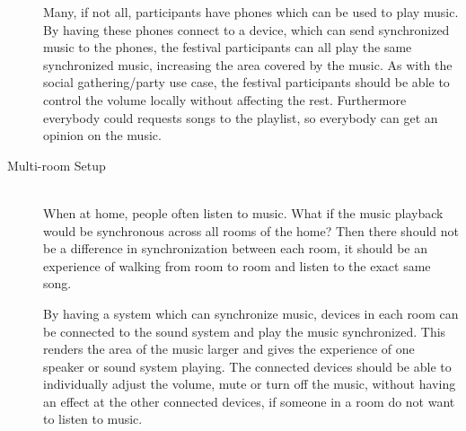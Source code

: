\begin{description}
        Many, if not all, participants have phones which can be used to play music.
        By having these phones connect to a device, which can send synchronized music to the phones,
        the festival participants can all play the same synchronized music,
        increasing the area covered by the music.
        As with the social gathering/party use case,
        the festival participants should be able to control the volume locally without affecting the rest.
        Furthermore everybody could requests songs to the playlist, so everybody can get an opinion on the music.

    \item[Multi-room Setup] \hfill\\
        When at home, people often listen to music.
        What if the music playback would be synchronous across all rooms of the home?
        Then there should not be a difference in synchronization between each room,
        it should be an experience of walking from room to room and listen to the exact same song.

        By having a system which can synchronize music, devices in each room can be connected to the sound system and play the music synchronized.
        This renders the area of the music larger and gives the experience of one speaker or sound system playing.
        The connected devices should be able to individually adjust the volume, mute or turn off the music,
        without having an effect at the other connected devices, if someone in a room do not want to listen to music. 
\end{description}
